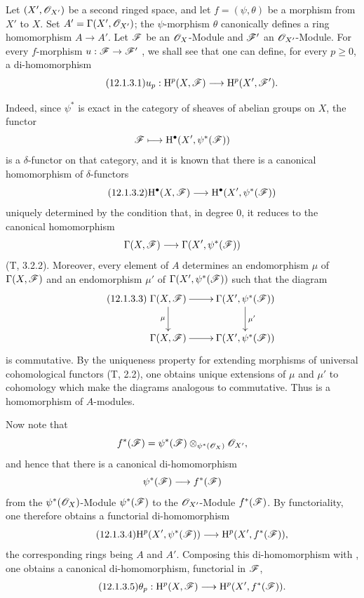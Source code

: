 \begin{env}[12.1.3]
\label{0.12.1.3}
Let $(X',\mathscr{O}_{X'})$ be a second ringed space, and let
$f=(\psi,\theta)$ be a morphism from $X'$ to $X$.
Set $A'=\Gamma(X',\mathscr{O}_{X'})$; the $\psi$-morphism $\theta$
canonically defines a ring homomorphism $A\to A'$.
Let $\mathscr{F}$ be an $\mathscr{O}_X$-Module and $\mathscr{F}'$ an
$\mathscr{O}_{X'}$-Module.
For every $f$-morphism $u:\mathscr{F}\to\mathscr{F}'$
, we shall see that one can define,
for every $p\geq0$, a di-homomorphism
\[
\label{0.12.1.3.1}
\tag{12.1.3.1}
  u_p:\mathrm{H}^p(X,\mathscr{F})\longrightarrow\mathrm{H}^p(X',\mathscr{F}').
\]

Indeed, since $\psi^*$ is exact in the category of sheaves of abelian
groups on $X$, the functor
\[
  \mathscr{F}\longmapsto\mathrm{H}^\bullet(X',\psi^*(\mathscr{F}))
\]
is a $\delta$-functor on that category, and it is known that there is a
canonical homomorphism of $\delta$-functors
\[
\label{0.12.1.3.2}
\tag{12.1.3.2}
  \mathrm{H}^\bullet(X,\mathscr{F})
  \longrightarrow
  \mathrm{H}^\bullet(X',\psi^*(\mathscr{F}))
\]
uniquely determined by the condition that, in degree $0$, it reduces
to the canonical homomorphism
\[
  \Gamma(X,\mathscr{F})
  \longrightarrow
  \Gamma(X',\psi^*(\mathscr{F}))
\]
(T, 3.2.2).
Moreover, every element of $A$ determines an endomorphism $\mu$ of
$\Gamma(X,\mathscr{F})$ and an endomorphism $\mu'$ of
$\Gamma(X',\psi^*(\mathscr{F}))$ such that the diagram
\[
\label{0.12.1.3.3}
\tag{12.1.3.3}
  \xymatrix{
    \Gamma(X,\sh{F})\ar[r]\ar[d]_\mu
      & \Gamma(X',\psi^*(\sh{F}))\ar[d]^{\mu'}\\
    \Gamma(X,\sh{F})\ar[r]
      & \Gamma(X',\psi^*(\sh{F}))
  }
\]
is commutative.
By the uniqueness property for extending morphisms of universal
cohomological functors (T, 2.2), one obtains unique extensions of
$\mu$ and $\mu'$ to cohomology which make the diagrams analogous to
 commutative.
Thus  is a homomorphism of $A$-modules.

Now note that
\[
  f^*(\mathscr{F})
  =
  \psi^*(\mathscr{F})
  \otimes_{\psi^*(\mathscr{O}_X)}
  \mathscr{O}_{X'},
\]
and hence that there is a canonical di-homomorphism
\[
  \psi^*(\mathscr{F})\longrightarrow f^*(\mathscr{F})
\]
from the $\psi^*(\mathscr{O}_X)$-Module $\psi^*(\mathscr{F})$ to the
$\mathscr{O}_{X'}$-Module $f^*(\mathscr{F})$.
By functoriality, one therefore obtains a functorial di-homomorphism
\[
\label{0.12.1.3.4}
\tag{12.1.3.4}
  \mathrm{H}^p(X',\psi^*(\mathscr{F}))
  \longrightarrow
  \mathrm{H}^p(X',f^*(\mathscr{F})),
\]
the corresponding rings being $A$ and $A'$.
Composing this di-homomorphism with , one obtains a
canonical di-homomorphism, functorial in $\mathscr{F}$,
\[
\label{0.12.1.3.5}
\tag{12.1.3.5}
  \theta_p:\mathrm{H}^p(X,\mathscr{F})
  \longrightarrow
  \mathrm{H}^p(X',f^*(\mathscr{F})).
\]


\end{env}
